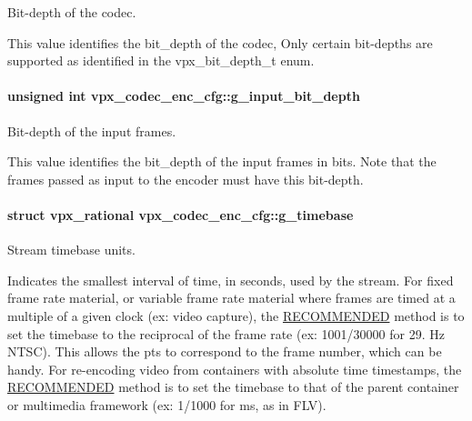 Bit-\/depth of the codec. 

This value identifies the bit\+\_\+depth of the codec, Only certain bit-\/depths are supported as identified in the vpx\+\_\+bit\+\_\+depth\+\_\+t enum. 
\paragraph[{\texorpdfstring{g\+\_\+input\+\_\+bit\+\_\+depth}{g_input_bit_depth}}]{\setlength{\rightskip}{0pt plus 5cm}unsigned int vpx\+\_\+codec\+\_\+enc\+\_\+cfg\+::g\+\_\+input\+\_\+bit\+\_\+depth}\hypertarget{structvpx__codec__enc__cfg_abebad3c575d7a5ba6c09a52fedb7d762}{}\label{structvpx__codec__enc__cfg_abebad3c575d7a5ba6c09a52fedb7d762}


Bit-\/depth of the input frames. 

This value identifies the bit\+\_\+depth of the input frames in bits. Note that the frames passed as input to the encoder must have this bit-\/depth. 
\paragraph[{\texorpdfstring{g\+\_\+timebase}{g_timebase}}]{\setlength{\rightskip}{0pt plus 5cm}struct {\bf vpx\+\_\+rational} vpx\+\_\+codec\+\_\+enc\+\_\+cfg\+::g\+\_\+timebase}\hypertarget{structvpx__codec__enc__cfg_a6498d378e4c29ef3e22258289e481087}{}\label{structvpx__codec__enc__cfg_a6498d378e4c29ef3e22258289e481087}


Stream timebase units. 

Indicates the smallest interval of time, in seconds, used by the stream. For fixed frame rate material, or variable frame rate material where frames are timed at a multiple of a given clock (ex\+: video capture), the \hyperlink{rfc2119_RECOMMENDED}{R\+E\+C\+O\+M\+M\+E\+N\+D\+ED} method is to set the timebase to the reciprocal of the frame rate (ex\+: 1001/30000 for 29. Hz N\+T\+SC). This allows the pts to correspond to the frame number, which can be handy. For re-\/encoding video from containers with absolute time timestamps, the \hyperlink{rfc2119_RECOMMENDED}{R\+E\+C\+O\+M\+M\+E\+N\+D\+ED} method is to set the timebase to that of the parent container or multimedia framework (ex\+: 1/1000 for ms, as in F\+LV). 
